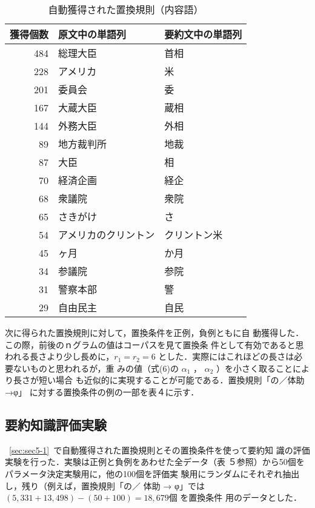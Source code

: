 \begin{table}
 \begin{center}
  \caption{自動獲得された置換規則（内容語）}
  \begin{tabular}{|r|l|l|} \hline \hline
   獲得個数 & 原文中の単語列 & 要約文中の単語列 \\ \hline
   484 & 総理大臣 & 首相 \\
   228 & アメリカ & 米 \\
   201 & 委員会 & 委 \\
   167 & 大蔵大臣 & 蔵相 \\
   144 & 外務大臣 & 外相 \\
   89 & 地方裁判所 & 地裁 \\
   87 & 大臣 & 相 \\
   70 & 経済企画 & 経企 \\
   68 & 衆議院 & 衆院 \\
   65 & さきがけ & さ \\
   54 & アメリカのクリントン & クリントン米 \\
   45 & ヶ月 & か月 \\
   34 & 参議院 & 参院 \\
   31 & 警察本部 & 警 \\
   29 & 自由民主 & 自民 \\ \hline
  \end{tabular}
 \end{center}
\end{table}

次に得られた置換規則に対して，置換条件を正例，負例ともに自
動獲得した．この際，前後のｎグラムの値はコーパスを見て置換条
件として有効であると思われる長さより少し長めに，$r_1 = r_2 = 6$
とした．実際にはこれほどの長さは必要ないものと思われるが，重
みの値（式(6)の $\alpha _1$ ， $\alpha _2$ ）を小さく取ることにより長さが短い場合
も近似的に実現することが可能である．置換規則「の／体助→φ」
に対する置換条件の例の一部を表４に示す．

\begin{table}
\begin{center}
\vspace*{-3mm}
  
\end{center}
\end{table}

\subsection{要約知識評価実験}
\label{sec:5-2}
~\ref{sec:sec5-1}~で自動獲得された置換規則とその置換条件を使って要約知
識の評価実験を行った．実験は正例と負例をあわせた全データ（表
５参照）から50個をパラメータ決定実験用に，他の100個を評価実
験用にランダムにそれぞれ抽出し，残り（例えば，置換規則「の／
体助 → φ」では $(5,331+13,498) - (50+100) = 18,679個$ を置換条件
用のデータとした．

